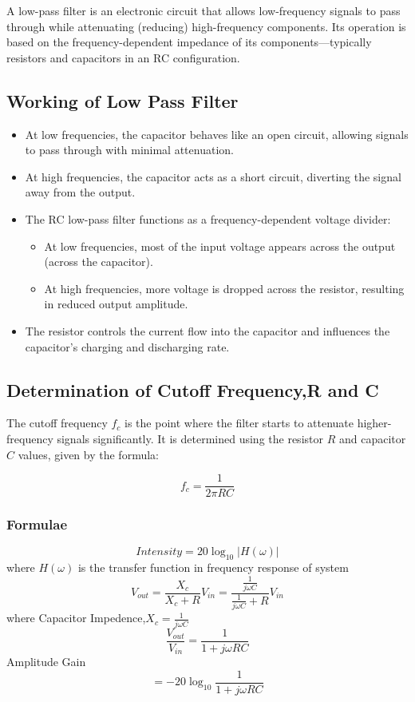 \documentclass[conference]{IEEEtran}
\begin{document}
A low-pass filter is an electronic circuit that allows low-frequency signals to pass through while attenuating (reducing) high-frequency components. Its operation is based on the frequency-dependent impedance of its components—typically resistors and capacitors in an RC configuration.

\subsection{Working of Low Pass Filter}

\begin{itemize}
    \item At low frequencies, the capacitor behaves like an open circuit, allowing signals to pass through with minimal attenuation.
    \item At high frequencies, the capacitor acts as a short circuit, diverting the signal away from the output.
    \item The RC low-pass filter functions as a frequency-dependent voltage divider: 
    \begin{itemize}
        \item At low frequencies, most of the input voltage appears across the output (across the capacitor).
        \item At high frequencies, more voltage is dropped across the resistor, resulting in reduced output amplitude.
    \end{itemize}
    \item The resistor controls the current flow into the capacitor and influences the capacitor's charging and discharging rate.
\end{itemize}

\subsection{Determination of Cutoff Frequency,R and C}

The cutoff frequency \( f_c \) is the point where the filter starts to attenuate higher-frequency signals significantly. It is determined using the resistor \( R \) and capacitor \( C \) values, given by the formula:

\begin{equation}
f_c = \frac{1}{2\pi RC}
\end{equation}

\subsubsection{Formulae}
$$Intensity = 20\log_{10}|H(\omega)|$$
where $H(\omega)$ is the transfer function in frequency response of system
$$V_{out} = \frac{X_c}{X_c+R}V_{in} = \frac{\frac{1}{j\omega C}}{\frac{1}{j\omega C}+R}V_{in}$$
where Capacitor Impedence,$X_c = \frac{1}{j\omega C}$
$$\frac{V_{out}}{V_{in}}=\frac{1}{1+j\omega RC}$$
Amplitude Gain$$= -20\log_{10}\frac{1}{1+j\omega RC}$$
\end{document}
